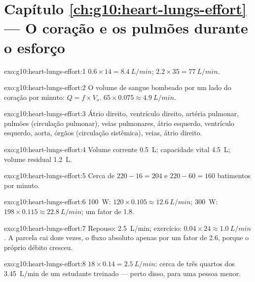 \section*{Capítulo \ref{ch:g10:heart-lungs-effort} --- O coração e os pulmões durante o esforço}

\begin{solution}{exo:g10:heart-lungs-effort:1}
$0.6 \times 14 = \qty{8.4}{L/min}$; $2.2 \times 35 = \qty{77}{L/min}$.
\end{solution}

\begin{solution}{exo:g10:heart-lungs-effort:2}
O volume de sangue bombeado por um lado do coração por minuto:
$Q = f \times V_s$. $65 \times 0.075 \approx \qty{4.9}{L/min}$.
\end{solution}

\begin{solution}{exo:g10:heart-lungs-effort:3}
Átrio direito, ventrículo direito, artéria pulmonar, pulmões
(circulação pulmonar), veias pulmonares, átrio esquerdo, ventrículo
esquerdo, aorta, órgãos (circulação sistêmica), veias, átrio direito.
\end{solution}

\begin{solution}{exo:g10:heart-lungs-effort:4}
Volume corrente \qty{0.5}{L}; capacidade vital \qty{4.5}{L}; volume
residual \qty{1.2}{L}.
\end{solution}

\begin{solution}{exo:g10:heart-lungs-effort:5}
Cerca de $220 - 16 = 204$ e $220 - 60 = 160$ batimentos por minuto.
\end{solution}

\begin{solution}{exo:g10:heart-lungs-effort:6}
\qty{100}{W}: $120 \times 0.105 \approx \qty{12.6}{L/min}$;
\qty{300}{W}: $198 \times 0.115 \approx \qty{22.8}{L/min}$; um fator de
1.8.
\end{solution}

\begin{solution}{exo:g10:heart-lungs-effort:7}
Repouso: \qty{2.5}{L/min}; exercício: $0.04 \times 24 \approx
\qty{1.0}{L/min}$. A parcela cai doze vezes, o fluxo absoluto apenas
por um fator de 2.6, porque o próprio débito cresceu.
\end{solution}

\begin{solution}{exo:g10:heart-lungs-effort:8}
$18 \times 0.14 = \qty{2.5}{L/min}$: cerca de três quartos dos
\qty{3.45}{L/min} de um estudante treinado --- perto disso, para uma
pessoa menor.
\end{solution}

